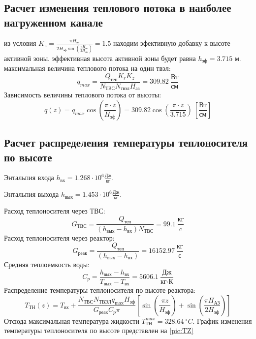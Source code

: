 \subsection{Расчет изменения теплового потока в наиболее нагруженном канале}
из условия $K_z = \frac {\pi H_{\text{аз}}} {2 H_{\text{эф}} \sin \left(\frac {\pi H_{\text{аз}}}{2H_{\text{эф}}}\right)}  = 1.5$ находим эфективную добавку к высоте активной зоны. эффективная высота активной зоны будет равна $h_{\text{эф}} = 3.715$ м. максимальная величина теплового потока на один твэл:
$$
q_{max} = \frac {Q_{\text{теп}}K_r K_z}{N_{ТВС}N_{\text{твэл}}H_{\text{аз}}} = 309.82\  \frac {\text{Вт}} {\text{см}}
$$ 
Зависимость величины теплового потока от высоты:
$$
q(z) = q_{max}\cos\left(\frac {\pi\cdot z} {H_{\text{эф}}}\right) = 309.82 \cos \left(\frac {\pi \cdot z} {3.715} \right)\ \left[\frac{\text{Вт}}{\text{см}} \right]
$$

\subsection{Расчет распределения температуры теплоносителя по высоте}

Энтальпия входа $h_{\text{вх}} =1.268 \cdot 10^6 \frac{Дж}{кг}$.%

\noindent Энтальпия выхода $h_{\text{вых}} =1.453 \cdot 10^6 \frac{Дж}{кг}$. %

\noindent Расход теплоносителя через ТВС:
$$
G_{ТВС} = \frac {Q_{\text{теп}}} {(h_{\text{вых}} - h_{\text{вх}})N_{\text{ТВС}}} = 99.1 \ \frac {\text{кг}}{\text{c}} 
$$
Расход теплоносителя через реактор:
$$
G_{\text{реак}} = \frac {Q_{\text{теп}}} {\left(h_{\text{вых}} - h_{\text{вх}}\right)} = 16152.97\ \frac{\text{кг}} {\text{с}}
$$
Средняя теплоемкость воды:
$$
C_p = \frac {h_{\text{вых}} - h_{\text{вх}}} {T_{\text{вых}} - T_{\text{вх}}} = 5606.1\ \frac{\text{Дж}} {\text{кг} \cdot \text{К}}
$$
\noindent Распределение температуры теплоносителя по высоте реактора:
$$
T_{ТН}(z) = T_{\text{вх}} + \frac {N_{\text{ТВС}}N_{\text{ТВЭЛ}}q_{\max}H_{\text{эф}}} {G_{\text{реак}}C_p\pi}\left[\sin \left(\frac {\pi z}{H_{\text{эф}}} \right) +\sin \left(\frac {\pi H_{\text{АЗ}}} {2H_{\text{эф}}} \right) \right]
$$
\noindent Отсюда максимальная температура жидкости $T_{\text{ТН}}^{max} = 328.64\  ^\circ C$.
График изменения температуры теплоносителя по высоте представлен на \ref{pic:TZ}

